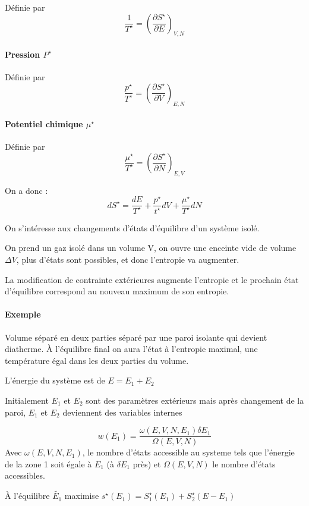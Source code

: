 \documentclass[12pt,a4paper]{report}
\begin{document}
Définie par 
\[
	\dfrac{1}{T^\star} = \left( \dfrac{\partial S^\star}{\partial E}\right)_{V,N}
\]

\paragraph{Pression \(P^\star\)}

Définie par
\[
	\dfrac{p^\star}{T^\star} = \left( \dfrac{\partial S^\star}{\partial V}\right)_{E,N}
\]

\paragraph{Potentiel chimique \(\mu^\star\)}

Définie par
\[
	\dfrac{\mu^\star}{T^\star} = \left( \dfrac{\partial S^\star}{\partial N}\right)_{E,V}
\]

On a donc :
\[
	dS^\star = \dfrac{dE}{T^\star} + \dfrac{p^\star}{t^\star}dV + \dfrac{\mu^\star}{T^\star}dN
\]

On s'intéresse aux changements d'états d'équilibre d'un système isolé.

On prend un gaz isolé dans un volume V, on ouvre une enceinte vide de volume \(\Delta V\), plus d'états sont possibles, et donc l'entropie va augmenter.

La modification de contrainte extérieures augmente l'entropie et le prochain état d'équilibre correspond au nouveau maximum de son entropie.

\paragraph{Exemple}

Volume séparé en deux parties séparé par une paroi isolante qui devient diatherme. À l'équilibre final on aura l'état à l'entropie maximal, une température égal dans les deux parties du volume.

L'énergie du système est de \(E = E_1 + E_2\)

Initialement \(E_1\) et \(E_2\) sont des paramètres extérieurs mais après changement de la paroi, \(E_1\) et \(E_2\) deviennent des variables internes

\[
	w(E_1) = \dfrac{\omega(E,V,N,E_1)\delta E_1}{\Omega(E,V,N)}
\]
Avec \(\omega(E,V,N,E_1)\), le nombre d'états accessible au systeme tels que l'énergie de la zone 1 soit égale à \(E_1\) (à \(\delta E_1\) près) et \(\Omega(E,V,N)\) le nombre d'états accessibles.

À l'équilibre \(\tilde{E_1}\) maximise \(s^\star(E_1) = S_1^\star(E_1) + S_2^\star(E-E_1)\)
\end{document}
